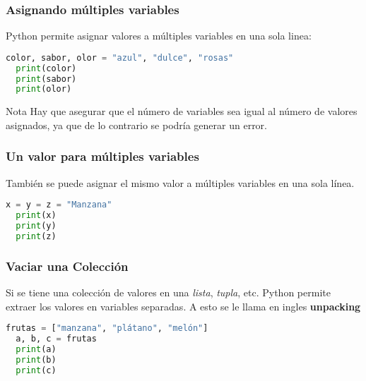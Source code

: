\begin{frame}[fragile]
  \frametitle{Asignando múltiples variables}

  Python permite asignar valores a múltiples variables en una sola linea:

  \vspace{\baselineskip}
  \begin{lstlisting}[language=Python]
  color, sabor, olor = "azul", "dulce", "rosas"
  print(color)
  print(sabor)
  print(olor)
  \end{lstlisting}

  \begin{alertblock}{Nota}
    Hay que asegurar que el número de variables sea igual al número de valores
    asignados, ya que de lo contrario se podría generar un error.
  \end{alertblock}
\end{frame}

\begin{frame}[fragile]
  \frametitle{Un valor para múltiples variables}

  También se puede asignar el mismo valor a múltiples variables en una sola
  línea.

  \vspace{\baselineskip}
  \begin{lstlisting}[language=Python]
  x = y = z = "Manzana"
  print(x)
  print(y)
  print(z)
  \end{lstlisting}
\end{frame}

\begin{frame}[fragile]
  \frametitle{Vaciar una Colección}

  Si se tiene una colección de valores en una \textit{lista}, \textit{tupla},
  etc. Python permite extraer los valores en variables separadas. A esto
  se le llama en ingles \textbf{unpacking}

  \vspace{\baselineskip}
  \begin{lstlisting}[language=Python]
  frutas = ["manzana", "plátano", "melón"]
  a, b, c = frutas
  print(a)
  print(b)
  print(c)
  \end{lstlisting}
\end{frame}

